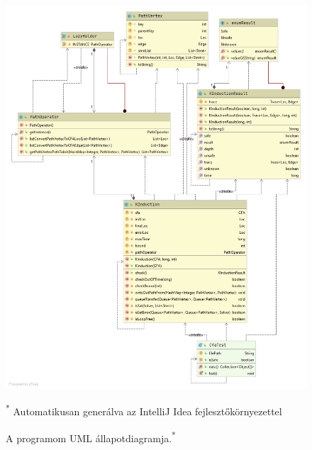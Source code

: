 \begin{figure}[!ht]
	\centering
	\includegraphics[width=150mm, keepaspectratio]{figures/bubanat.png}
	\caption[Caption for LOF]{A programom UML állapotdiagramja.\textsuperscript{*}}
	\small\textsuperscript{*} Automatikusan generálva az IntelliJ Idea fejlesztőkörnyezettel
	\label{fig:state_diagram}
\end{figure}
\clearpage %

